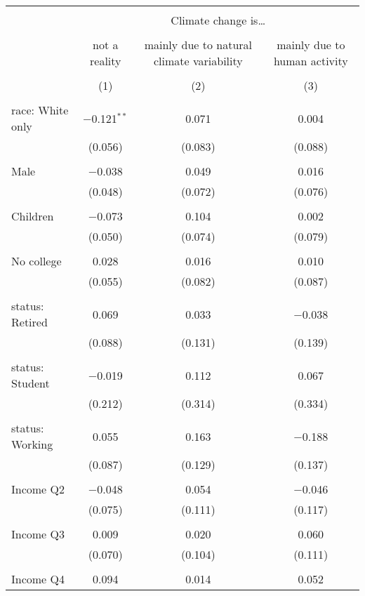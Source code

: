 
\begin{tabular}{@{\extracolsep{5pt}}lccc} 
\\[-1.8ex]\hline 
\hline \\[-1.8ex] 
 & \multicolumn{3}{c}{Climate change is…} \\ 
\cline{2-4} 
\\[-1.8ex] & not a reality & mainly due to natural climate variability & mainly due to human activity \\ 
\\[-1.8ex] & (1) & (2) & (3)\\ 
\hline \\[-1.8ex] 
 race: White only & $-$0.121$^{**}$ & 0.071 & 0.004 \\ 
  & (0.056) & (0.083) & (0.088) \\ 
  & & & \\ 
 Male & $-$0.038 & 0.049 & 0.016 \\ 
  & (0.048) & (0.072) & (0.076) \\ 
  & & & \\ 
 Children & $-$0.073 & 0.104 & 0.002 \\ 
  & (0.050) & (0.074) & (0.079) \\ 
  & & & \\ 
 No college & 0.028 & 0.016 & 0.010 \\ 
  & (0.055) & (0.082) & (0.087) \\ 
  & & & \\ 
 status: Retired & 0.069 & 0.033 & $-$0.038 \\ 
  & (0.088) & (0.131) & (0.139) \\ 
  & & & \\ 
 status: Student & $-$0.019 & 0.112 & 0.067 \\ 
  & (0.212) & (0.314) & (0.334) \\ 
  & & & \\ 
 status: Working & 0.055 & 0.163 & $-$0.188 \\ 
  & (0.087) & (0.129) & (0.137) \\ 
  & & & \\ 
 Income Q2 & $-$0.048 & 0.054 & $-$0.046 \\ 
  & (0.075) & (0.111) & (0.117) \\ 
  & & & \\ 
 Income Q3 & 0.009 & 0.020 & 0.060 \\ 
  & (0.070) & (0.104) & (0.111) \\ 
  & & & \\ 
 Income Q4 & 0.094 & 0.014 & 0.052 \\ 

\end{tabular}
